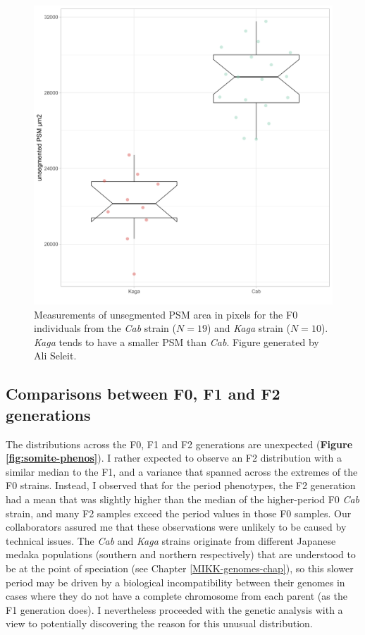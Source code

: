 \documentclass[
]{book}
\begin{document}
\begin{figure}
\includegraphics[width=1\linewidth]{figs/somites/ali_PSM_Cab_Kaga} \caption{Measurements of unsegmented PSM area in pixels for the F0 individuals from the \emph{Cab} strain (\(N = 19\)) and \emph{Kaga} strain (\(N = 10\)). \emph{Kaga} tends to have a smaller PSM than \emph{Cab}. Figure generated by Ali Seleit.}\label{fig:ali-psm-F0}
\end{figure}

\hypertarget{comparisons-between-f0-f1-and-f2-generations}{%
\subsection{Comparisons between F0, F1 and F2 generations}\label{comparisons-between-f0-f1-and-f2-generations}}

The distributions across the F0, F1 and F2 generations are unexpected (\textbf{Figure \ref{fig:somite-phenos}}). I rather expected to observe an F2 distribution with a similar median to the F1, and a variance that spanned across the extremes of the F0 strains. Instead, I observed that for the period phenotypes, the F2 generation had a mean that was slightly higher than the median of the higher-period F0 \emph{Cab} strain, and many F2 samples exceed the period values in those F0 samples. Our collaborators assured me that these observations were unlikely to be caused by technical issues. The \emph{Cab} and \emph{Kaga} strains originate from different Japanese medaka populations (southern and northern respectively) that are understood to be at the point of speciation (see Chapter \ref{MIKK-genomes-chap}), so this slower period may be driven by a biological incompatibility between their genomes in cases where they do not have a complete chromosome from each parent (as the F1 generation does). I nevertheless proceeded with the genetic analysis with a view to potentially discovering the reason for this unusual distribution.
\end{document}
